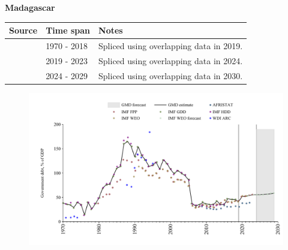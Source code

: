 \documentclass[12pt,a4paper,landscape]{article}
\begin{document}
\begin{adjustbox}{max totalsize={\paperwidth}{\paperheight},center}
\begin{minipage}[t][\textheight][t]{\textwidth}
\vspace*{0.5cm}
{}
\begin{center}
{\Large\bfseries Madagascar}
\end{center}
\vspace{0.5cm}
\begin{table}[H]
\centering
\small
\begin{tabular}{|l|l|l|}
\hline
\textbf{Source} & \textbf{Time span} & \textbf{Notes} \\
\hline
\rowcolor{white}\cite{IMF_GDD}& 1970 - 2018 &Spliced using overlapping data in 2019.\\
\rowcolor{lightgray}\cite{IMF_FPP}& 2019 - 2023 &Spliced using overlapping data in 2024.\\
\rowcolor{white}\cite{IMF_WEO_forecast}& 2024 - 2029 &Spliced using overlapping data in 2030.\\
\hline
\end{tabular}
\end{table}
\begin{figure}[H]
\centering
\includegraphics[width=\textwidth,height=0.6\textheight,keepaspectratio]{graphs/MDG_govdebt_GDP.pdf}
\end{figure}
\end{minipage}
\end{adjustbox}
\end{document}
